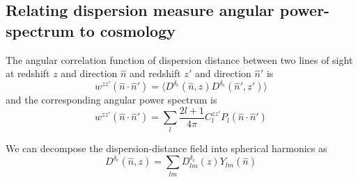 \documentclass[onecolumn,prd,noshowpacs,nofootinbib,amsmath,amssymb]{revtex4}
\begin{document}
\subsection{Relating dispersion measure angular power-spectrum to cosmology}

The angular correlation function of dispersion distance between two lines of sight at redshift $z$ and direction $\hat{n}$ and redshift $z'$ and direction $\hat{n}'$ is
\begin{equation}
w^{z z'}(\hat{n}\cdot\hat{n}') = \langle D^{\delta_e}(\hat{n}, z) D^{\delta_e}(\hat{n}', z') \rangle
\end{equation}
and the corresponding angular power spectrum is
\begin{equation}
w^{z z'}(\hat{n}\cdot\hat{n}') = \sum_l \frac{2l+1}{4 \pi} C_l^{z z'} P_l(\hat{n}\cdot\hat{n}')
\end{equation}

We can decompose the dispersion-distance field into spherical harmonics as
\begin{equation}
    D^{\delta_e}(\hat{n}, z) = \sum_{l m} D^{\delta_e}_{l m}(z) Y_{l m} (\hat{n})
\end{equation}
\end{document}
